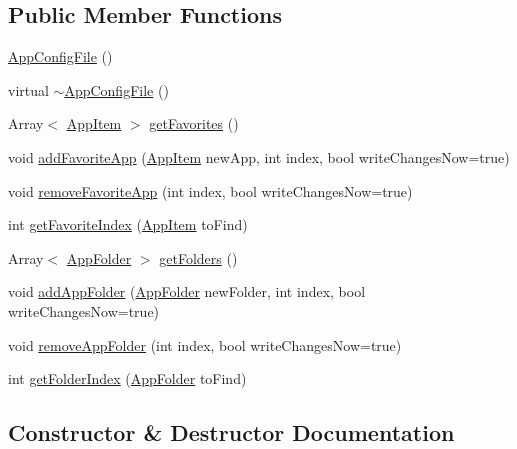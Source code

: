 \subsection*{Public Member Functions}
\begin{DoxyCompactItemize}
\item 
\mbox{\hyperlink{classAppConfigFile_a8b8c0dff9b79a1bf6f2e8f840ef28fa9}{App\+Config\+File}} ()
\item 
virtual \mbox{\hyperlink{classAppConfigFile_a8748d74c5d81884dcf9de17f7f3655b4}{$\sim$\+App\+Config\+File}} ()
\item 
Array$<$ \mbox{\hyperlink{structAppConfigFile_1_1AppItem}{App\+Item}} $>$ \mbox{\hyperlink{classAppConfigFile_adafa59cdb408a3b4a29d5bc247120c21}{get\+Favorites}} ()
\item 
void \mbox{\hyperlink{classAppConfigFile_acf142d89fbe1eec9c39fd16ee188a38e}{add\+Favorite\+App}} (\mbox{\hyperlink{structAppConfigFile_1_1AppItem}{App\+Item}} new\+App, int index, bool write\+Changes\+Now=true)
\item 
void \mbox{\hyperlink{classAppConfigFile_aadece130a132eb7b490e99d980aa0206}{remove\+Favorite\+App}} (int index, bool write\+Changes\+Now=true)
\item 
int \mbox{\hyperlink{classAppConfigFile_afbe8b003a2d63d4bdf9f595d6c70ac79}{get\+Favorite\+Index}} (\mbox{\hyperlink{structAppConfigFile_1_1AppItem}{App\+Item}} to\+Find)
\item 
Array$<$ \mbox{\hyperlink{structAppConfigFile_1_1AppFolder}{App\+Folder}} $>$ \mbox{\hyperlink{classAppConfigFile_a4e7df52156d7ae5c5c7e8abeb56609e7}{get\+Folders}} ()
\item 
void \mbox{\hyperlink{classAppConfigFile_a0d5b0b0ccc5956f17fdb78a62b46d966}{add\+App\+Folder}} (\mbox{\hyperlink{structAppConfigFile_1_1AppFolder}{App\+Folder}} new\+Folder, int index, bool write\+Changes\+Now=true)
\item 
void \mbox{\hyperlink{classAppConfigFile_a59fdc4888bb0575bb8c7c9a3de3e4876}{remove\+App\+Folder}} (int index, bool write\+Changes\+Now=true)
\item 
int \mbox{\hyperlink{classAppConfigFile_aa9ad1776ef603daf34e26cb35be8c123}{get\+Folder\+Index}} (\mbox{\hyperlink{structAppConfigFile_1_1AppFolder}{App\+Folder}} to\+Find)
\end{DoxyCompactItemize}


\subsection{Constructor \& Destructor Documentation}
\mbox{\label{classAppConfigFile_a8b8c0dff9b79a1bf6f2e8f840ef28fa9}} 
